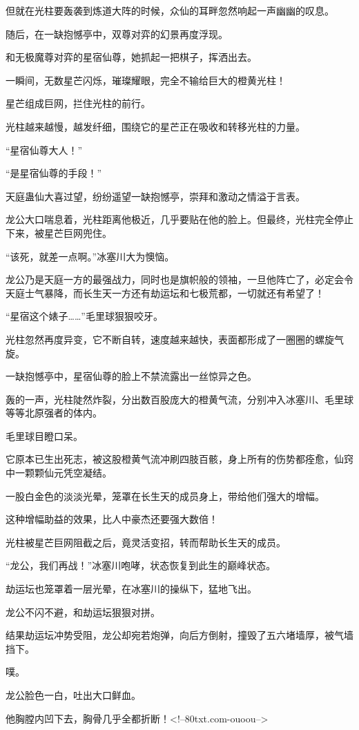 \begin{this_body}
但就在光柱要轰袭到炼道大阵的时候，众仙的耳畔忽然响起一声幽幽的叹息。

随后，在一缺抱憾亭中，双尊对弈的幻景再度浮现。

和无极魔尊对弈的星宿仙尊，她抓起一把棋子，挥洒出去。

一瞬间，无数星芒闪烁，璀璨耀眼，完全不输给巨大的橙黄光柱！

星芒组成巨网，拦住光柱的前行。

光柱越来越慢，越发纤细，围绕它的星芒正在吸收和转移光柱的力量。

“星宿仙尊大人！”

“是星宿仙尊的手段！”

天庭蛊仙大喜过望，纷纷遥望一缺抱憾亭，崇拜和激动之情溢于言表。

龙公大口喘息着，光柱距离他极近，几乎要贴在他的脸上。但最终，光柱完全停止下来，被星芒巨网兜住。

“该死，就差一点啊。”冰塞川大为懊恼。

龙公乃是天庭一方的最强战力，同时也是旗帜般的领袖，一旦他阵亡了，必定会令天庭士气暴降，而长生天一方还有劫运坛和七极荒都，一切就还有希望了！

“星宿这个婊子……”毛里球狠狠咬牙。

光柱忽然再度异变，它不断自转，速度越来越快，表面都形成了一圈圈的螺旋气旋。

一缺抱憾亭中，星宿仙尊的脸上不禁流露出一丝惊异之色。

轰的一声，光柱陡然炸裂，分出数百股庞大的橙黄气流，分别冲入冰塞川、毛里球等等北原强者的体内。

毛里球目瞪口呆。

它原本已生出死志，被这股橙黄气流冲刷四肢百骸，身上所有的伤势都痊愈，仙窍中一颗颗仙元凭空凝结。

一股白金色的淡淡光晕，笼罩在长生天的成员身上，带给他们强大的增幅。

这种增幅助益的效果，比人中豪杰还要强大数倍！

光柱被星芒巨网阻截之后，竟灵活变招，转而帮助长生天的成员。

“龙公，我们再战！”冰塞川咆哮，状态恢复到此生的巅峰状态。

劫运坛也笼罩着一层光晕，在冰塞川的操纵下，猛地飞出。

龙公不闪不避，和劫运坛狠狠对拼。

结果劫运坛冲势受阻，龙公却宛若炮弹，向后方倒射，撞毁了五六堵墙厚，被气墙挡下。

噗。

龙公脸色一白，吐出大口鲜血。

他胸膛内凹下去，胸骨几乎全都折断！<!--80txt.com-ouoou-->

\end{this_body}

